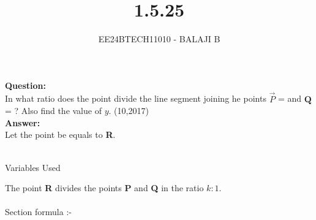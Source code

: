 \documentclass[journal]{IEEEtran}
\begin{document}

\vspace{3cm}

\title{1.5.25}
\author{EE24BTECH11010 - BALAJI B}
{\let\newpage\relax\maketitle}

\renewcommand{\thefigure}{\theenumi}
\renewcommand{\thetable}{\theenumi}
\setlength{\intextsep}{10pt} %


\renewcommand{\thetable}{\theenumi}

\textbf{Question:}
\\
In what ratio does the point  divide the line segment joining he points $\vec{P}$ =  and $\textbf{Q}$ =  ? Also find the value of $y$. \hfill(10,2017)\\ 


\textbf{Answer:} \\
Let the point  be equals to \textbf{R}.\\ \\

\begin{table}[h!]    
  \centering
  
  \caption{Variables Used}
  \label{tab1.5.37.1}
\end{table}

The point \textbf{R}  divides the points \textbf{P} and \textbf{Q}
in the ratio $k:1$. \\ \\
Section formula :-\\ \\
\end{document}
